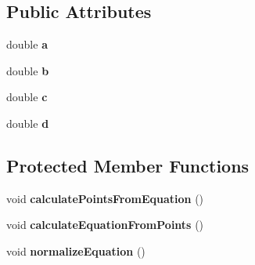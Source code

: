\subsection*{\-Public \-Attributes}
\begin{DoxyCompactItemize}
\item 
\hypertarget{classGroundData_a1fb86e0af3b29fe06e944a409ac01151}{double {\bfseries a}}\label{classGroundData_a1fb86e0af3b29fe06e944a409ac01151}

\item 
\hypertarget{classGroundData_a2cdcf741a7a0bcb2d7b2ef1eb3aa83c6}{double {\bfseries b}}\label{classGroundData_a2cdcf741a7a0bcb2d7b2ef1eb3aa83c6}

\item 
\hypertarget{classGroundData_a3ec92519e2c1e34f503e41a00a0da5e1}{double {\bfseries c}}\label{classGroundData_a3ec92519e2c1e34f503e41a00a0da5e1}

\item 
\hypertarget{classGroundData_a1272c9dc45835fa2e260e28fdfd585b5}{double {\bfseries d}}\label{classGroundData_a1272c9dc45835fa2e260e28fdfd585b5}

\end{DoxyCompactItemize}
\subsection*{\-Protected \-Member \-Functions}
\begin{DoxyCompactItemize}
\item 
\hypertarget{classGroundData_a3abf6b3d83c832202aabb1aabc58b877}{void {\bfseries calculate\-Points\-From\-Equation} ()}\label{classGroundData_a3abf6b3d83c832202aabb1aabc58b877}

\item 
\hypertarget{classGroundData_a80b35f02d5a93dbcb6e13c9fd1116f8e}{void {\bfseries calculate\-Equation\-From\-Points} ()}\label{classGroundData_a80b35f02d5a93dbcb6e13c9fd1116f8e}

\item 
\hypertarget{classGroundData_afc48a5e845ef99030e6fd4b2e67dc5e7}{void {\bfseries normalize\-Equation} ()}\label{classGroundData_afc48a5e845ef99030e6fd4b2e67dc5e7}

\end{DoxyCompactItemize}
